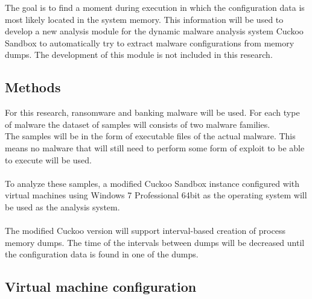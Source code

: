 \documentclass[conference]{IEEEtran}
\begin{document}
The goal is to find a moment during execution in which the configuration data is most likely located in the system memory. This information will be used to develop a new analysis module for the dynamic malware analysis system Cuckoo Sandbox to automatically try to extract malware configurations from memory dumps. The development of this module is not included in this research.

\subsection{Methods}

For this research, ransomware and banking malware will be used. For each type of malware the dataset of samples will consists of two malware families.\\
The samples will be in the form of executable files of the actual malware. This means no malware that will still need to perform some form of exploit to be able to execute will be used.\\\\To analyze these samples, a modified Cuckoo Sandbox instance configured with virtual machines using Windows 7  Professional 64bit as the operating system will be used as the analysis system. \\\\The modified Cuckoo version will support interval-based creation of process memory dumps. The time of the intervals between dumps will be decreased until the configuration data is found in one of the dumps.


\subsection{Virtual machine configuration}
\end{document}
